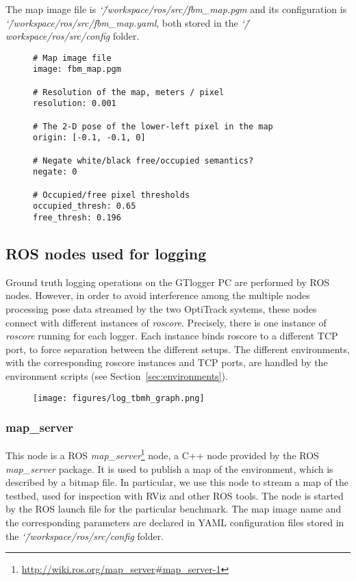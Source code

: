 \documentclass[a4paper]{article}
\newcommand{\srcdir}{\char`\~/workspace/ros/src/}
\begin{document}
The map image file is \emph{\srcdir fbm\_map.pgm} and its configuration is \emph{\srcdir fbm\_map.yaml}, both stored in the \emph{\srcdir config} folder.

\begin{figure}[h!]
	\noindent
	\begin{minipage}[t!]{\linewidth}
		\begin{lstlisting}[caption=fbm\_map.yaml]
# Map image file
image: fbm_map.pgm

# Resolution of the map, meters / pixel
resolution: 0.001

# The 2-D pose of the lower-left pixel in the map
origin: [-0.1, -0.1, 0]

# Negate white/black free/occupied semantics?
negate: 0

# Occupied/free pixel thresholds
occupied_thresh: 0.65
free_thresh: 0.196
		\end{lstlisting}
	\end{minipage}
\end{figure}

\clearpage


\subsection{ROS nodes used for logging}
\label{ROSnodes}
Ground truth logging operations on the GTlogger PC are performed by ROS nodes. However, in order to avoid interference among the multiple nodes processing pose data streamed by the two OptiTrack systems, these nodes connect with different instances of \textit{roscore}. Precisely, there is one instance of \emph{roscore} running for each logger.
Each instance binds roscore to a different TCP port, to force separation between the different setups.
The different environments, with the corresponding roscore instances and TCP ports, are handled by the environment scripts (see Section~\ref{sec:environments}).

\begin{figure}[h!]
  \centering
  \texttt{[image: figures/log\_tbmh\_graph.png]}
\end{figure}

\subsubsection{map\_server}
\label{sec:map_server}

This node is a ROS \emph{map\_server}\footnote{\url{http://wiki.ros.org/map\_server\#map\_server-1}} node, a C++ node provided by the ROS \emph{map\_server} package.
It is used to publish a map of the environment, which is described by a bitmap file.
In particular, we use this node to stream a map of the testbed, used for inspection with RViz and other ROS tools.
The node is started by the ROS launch file for the particular benchmark.
The map image name and the corresponding parameters are declared in YAML configuration files stored in the \emph{\srcdir config} folder.
\end{document}
